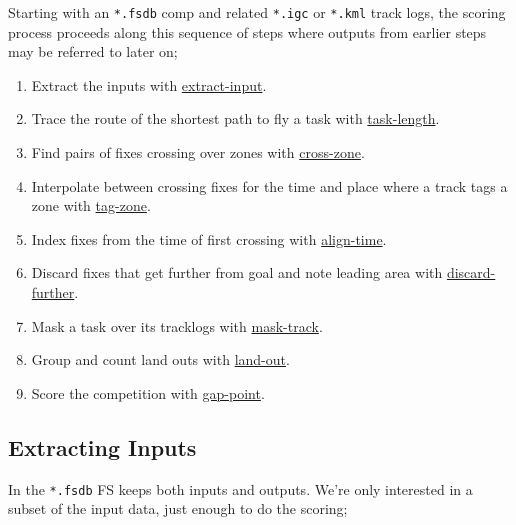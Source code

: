 \documentclass[gap.tex]{subfiles}
\begin{document}
Starting with an \texttt{*.fsdb} comp and related \texttt{*.igc} or
\texttt{*.kml} track logs, the scoring process proceeds along this 
sequence of steps where outputs from earlier steps may be referred to later on;
\begin{enumerate}
    \item
        Extract the inputs with
        \href{https://github.com/BlockScope/flare-timing/tree/master/flare-timing/prod-apps/extract-input}{extract-input}.
    \item
        Trace the route of the shortest path to fly a task with
        \href{https://github.com/BlockScope/flare-timing/tree/master/flare-timing/prod-apps/task-length}{task-length}.
    \item
        Find pairs of fixes crossing over zones with
        \href{https://github.com/BlockScope/flare-timing/tree/master/flare-timing/prod-apps/cross-zone}{cross-zone}.
    \item
        Interpolate between crossing fixes for the time and place where a track
        tags a zone with
        \href{https://github.com/BlockScope/flare-timing/tree/master/flare-timing/prod-apps/tag-zone}{tag-zone}.
    \item
        Index fixes from the time of first crossing with
        \href{https://github.com/BlockScope/flare-timing/tree/master/flare-timing/prod-apps/align-time}{align-time}.
    \item
        Discard fixes that get further from goal and note leading area with
        \href{https://github.com/BlockScope/flare-timing/tree/master/flare-timing/prod-apps/discard-further}{discard-further}.
    \item
        Mask a task over its tracklogs with
        \href{https://github.com/BlockScope/flare-timing/tree/master/flare-timing/prod-apps/mask-track}{mask-track}.
    \item
        Group and count land outs with
        \href{https://github.com/BlockScope/flare-timing/tree/master/flare-timing/prod-apps/land-out}{land-out}.
    \item
        Score the competition with
        \href{https://github.com/BlockScope/flare-timing/tree/master/flare-timing/prod-apps/gap-point}{gap-point}.  
\end{enumerate}

\newpage
\subsection{Extracting Inputs}
In the \texttt{*.fsdb} FS keeps both inputs and outputs. We're only interested
in a subset of the input data, just enough to do the scoring;
\end{document}
